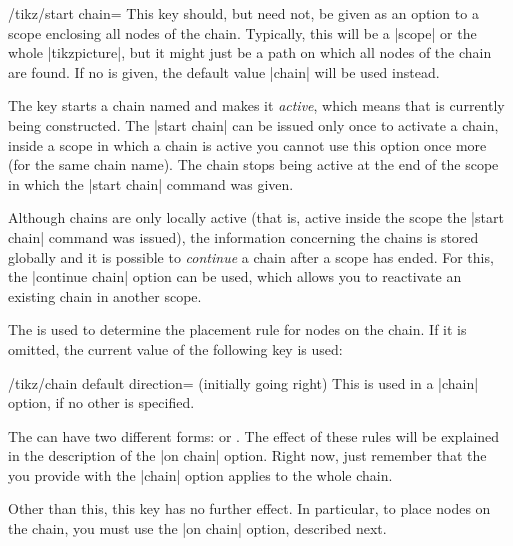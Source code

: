 \begin{key}{/tikz/start chain=}
  This key should, but need not, be given as an option to a scope
  enclosing all nodes of the chain. Typically, this will be a |scope|
  or the whole |tikzpicture|, but it might just be a path on which all
  nodes of the chain are found.
  If no  is given, the default value |chain| will be
  used instead.

  The key starts a chain named  and makes it
  \emph{active}, which means that is currently being constructed. The
  |start chain| can be issued only once to activate a chain, inside a
  scope in which a chain is active you cannot use this option once
  more (for the same chain name). The chain stops being active at the
  end of the scope in which the |start chain| command was given.

  Although chains are only locally active (that is, active inside the
  scope the |start chain| command was issued), the information
  concerning the chains is stored globally and it is possible
  to \emph{continue} a chain after a scope has ended. For this, the
  |continue chain| option can be used, which allows you to reactivate
  an existing chain in another scope.

  The  is used to determine the placement rule for
  nodes on the chain. If it is omitted, the current value of the
  following key is used:
  \begin{key}{/tikz/chain default direction=
      (initially going right)}
    This  is used in a |chain| option, if no other
     is specified.
  \end{key}

  The  can have two different forms:
   or
  . The effect of these rules will be
  explained in the description of the |on chain| option. Right now,
  just remember that the  you provide with the |chain|
  option applies to the whole chain.
  
  Other than this, this key has no further effect. In particular, to
  place nodes on the chain, you must use the |on chain| option,
  described next.
\begin{codeexample}[]
\end{codeexample}


\end{key}
